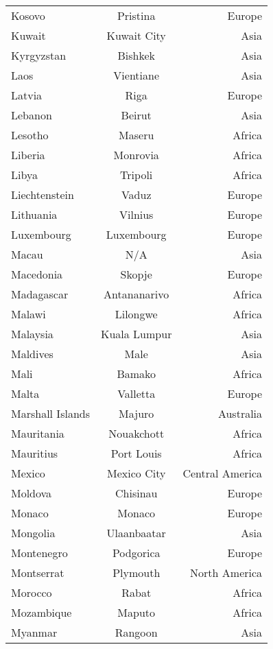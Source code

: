 \begin{longtable}{l|c|r}
Kosovo          & Pristina          & Europe\\
Kuwait          & Kuwait City       & Asia\\
Kyrgyzstan      & Bishkek           & Asia\\
Laos            & Vientiane         & Asia\\
Latvia          & Riga              & Europe\\
Lebanon         & Beirut            & Asia\\
Lesotho         & Maseru            & Africa\\
Liberia         & Monrovia          & Africa\\
Libya           & Tripoli           & Africa\\
Liechtenstein   & Vaduz             & Europe\\
Lithuania       & Vilnius           & Europe\\
Luxembourg      & Luxembourg        & Europe\\
Macau           & N/A               & Asia\\
Macedonia       & Skopje            & Europe\\
Madagascar      & Antananarivo      & Africa\\
Malawi          & Lilongwe          & Africa\\
Malaysia        & Kuala Lumpur      & Asia\\
Maldives        & Male              & Asia\\
Mali            & Bamako            & Africa\\
Malta           & Valletta          & Europe\\
Marshall Islands & Majuro           & Australia\\
Mauritania      & Nouakchott        & Africa\\
Mauritius       & Port Louis        & Africa\\
Mexico          & Mexico City       & Central America\\
Moldova         & Chisinau          & Europe\\
Monaco          & Monaco            & Europe\\
Mongolia        & Ulaanbaatar       & Asia\\
Montenegro      & Podgorica         & Europe\\
Montserrat      & Plymouth          & North America\\
Morocco         & Rabat             & Africa\\
Mozambique      & Maputo            & Africa\\
Myanmar         & Rangoon           & Asia\\ \hline
\end{longtable}


